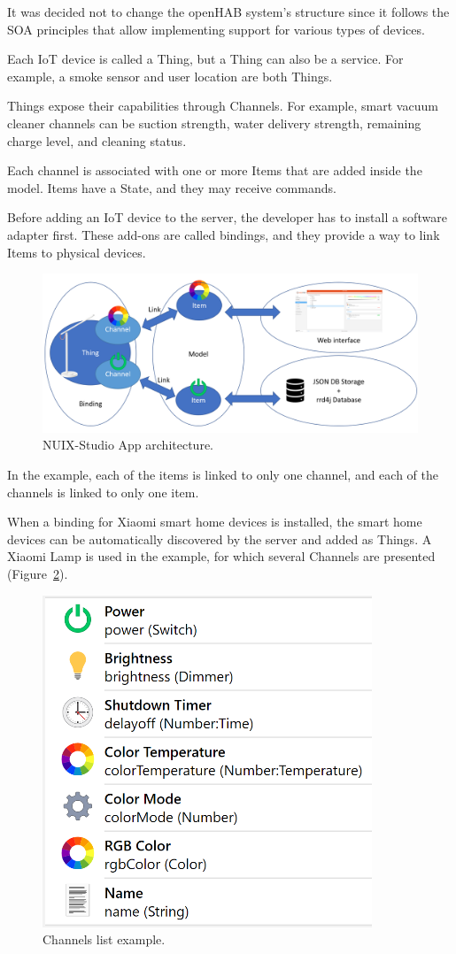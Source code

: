It was decided not to change the openHAB system's structure since it follows the SOA principles that allow implementing support for various types of devices.

Each IoT device is called a Thing, but a Thing can also be a service. For example, a smoke sensor and user location are both Things.

Things expose their capabilities through Channels. For example, smart vacuum cleaner channels can be suction strength, water delivery strength, remaining charge level, and cleaning status.

Each channel is associated with one or more Items that are added inside the model. Items have a State, and they may receive commands. 

Before adding an IoT device to the server, the developer has to install a software adapter first. These add-ons are called bindings, and they provide a way to link Items to physical devices.

\begin{figure}
  \centering
  \includegraphics[width=0.9\linewidth]{figures/openHABServerStructure.png}
  \caption{NUIX-Studio App architecture.}
  \label{fig:openHABServerStructure-figure}
\end{figure}

In the example, each of the items is linked to only one channel, and each of the channels is linked to only one item. 

When a binding for Xiaomi smart home devices is installed, the smart home devices can be automatically discovered by the server and added as Things. A Xiaomi Lamp is used in the example, for which several Channels are presented (Figure~\ref{fig:XiaomiLampChannels-figure}).

\begin{figure}
  \centering
  \includegraphics[width=0.6\linewidth]{figures/XiaomiLampChannels.png}
  \caption{Channels list example.}
  \label{fig:XiaomiLampChannels-figure}
\end{figure}

